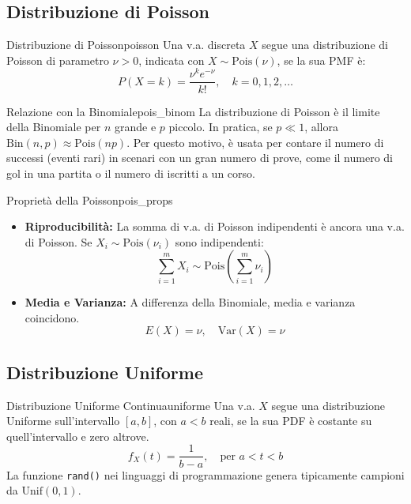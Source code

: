 \subsection{Distribuzione di Poisson}

\begin{definizione}{Distribuzione di Poisson}{poisson}
Una v.a. discreta \(X\) segue una distribuzione di Poisson di parametro \(\nu > 0\), indicata con \(X \sim \text{Pois}(\nu)\), se la sua PMF è:
\[
P(X=k) = \frac{\nu^k e^{-\nu}}{k!}, \quad k=0, 1, 2, \dots \text{}
\]
\end{definizione}

\begin{nota}{Relazione con la Binomiale}{pois_binom}
La distribuzione di Poisson è il limite della Binomiale per \(n\) grande e \(p\) piccolo. In pratica, se \(p \ll 1\), allora \(\text{Bin}(n,p) \approx \text{Pois}(np)\). Per questo motivo, è usata per contare il numero di successi (eventi rari) in scenari con un gran numero di prove, come il numero di gol in una partita o il numero di iscritti a un corso.
\end{nota}

\begin{proposizione}{Proprietà della Poisson}{pois_props}
\begin{itemize}
    \item \textbf{Riproducibilità:} La somma di v.a. di Poisson indipendenti è ancora una v.a. di Poisson. Se \(X_i \sim \text{Pois}(\nu_i)\) sono indipendenti:
    \[ \sum_{i=1}^{m} X_i \sim \text{Pois}\left(\sum_{i=1}^{m} \nu_i\right) \text{} \]
    \item \textbf{Media e Varianza:} A differenza della Binomiale, media e varianza coincidono.
    \[ E(X) = \nu, \quad \text{Var}(X) = \nu \text{} \]
\end{itemize}
\end{proposizione}

\subsection{Distribuzione Uniforme}

\begin{definizione}{Distribuzione Uniforme Continua}{uniforme}
Una v.a. \(X\) segue una distribuzione Uniforme sull'intervallo \([a,b]\), con \(a<b\) reali, se la sua PDF è costante su quell'intervallo e zero altrove.
\[
f_X(t) = \frac{1}{b-a}, \quad \text{per } a < t < b \text{}
\]
La funzione \texttt{rand()} nei linguaggi di programmazione genera tipicamente campioni da \(\text{Unif}(0,1)\).
\end{definizione}

